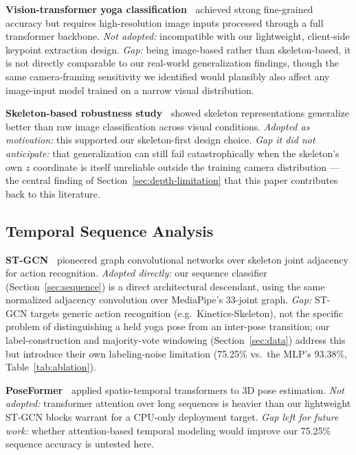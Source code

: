 \documentclass[conference]{IEEEtran}
\begin{document}
\textbf{Vision-transformer yoga classification~\cite{yogapose_transformer_2023}}
achieved strong fine-grained accuracy but requires high-resolution image
inputs processed through a full transformer backbone. \emph{Not adopted:}
incompatible with our lightweight, client-side keypoint extraction design.
\emph{Gap:} being image-based rather than skeleton-based, it is not directly
comparable to our real-world generalization findings, though the same
camera-framing sensitivity we identified would plausibly also affect any
image-input model trained on a narrow visual distribution.

\textbf{Skeleton-based robustness study~\cite{skeleton_yoga_2025}} showed
skeleton representations generalize better than raw image classification
across visual conditions. \emph{Adopted as motivation:} this supported our
skeleton-first design choice. \emph{Gap it did not anticipate:} that
generalization can still fail catastrophically when the skeleton's own $z$
coordinate is itself unreliable outside the training camera distribution ---
the central finding of Section~\ref{sec:depth-limitation} that this paper
contributes back to this literature.

\subsection{Temporal Sequence Analysis}

\textbf{ST-GCN~\cite{stgcn_2018}} pioneered graph convolutional networks over
skeleton joint adjacency for action recognition. \emph{Adopted directly:} our
sequence classifier (Section~\ref{sec:sequence}) is a direct architectural
descendant, using the same normalized adjacency convolution over MediaPipe's
33-joint graph. \emph{Gap:} ST-GCN targets generic action recognition (e.g.\
Kinetics-Skeleton), not the specific problem of distinguishing a held yoga
pose from an inter-pose transition; our label-construction and majority-vote
windowing (Section~\ref{sec:data}) address this but introduce their own
labeling-noise limitation (75.25\% vs.\ the MLP's 93.38\%, Table~\ref{tab:ablation}).

\textbf{PoseFormer~\cite{poseformer_2021}} applied spatio-temporal
transformers to 3D pose estimation. \emph{Not adopted:} transformer attention
over long sequences is heavier than our lightweight ST-GCN blocks warrant for
a CPU-only deployment target. \emph{Gap left for future work:} whether
attention-based temporal modeling would improve our 75.25\% sequence accuracy
is untested here.
\end{document}
